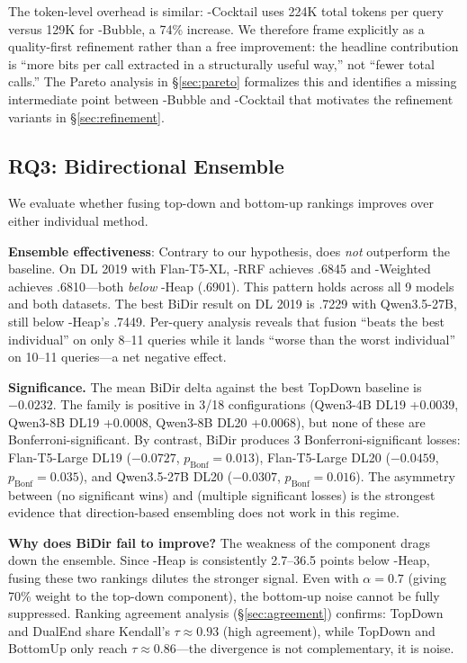 The token-level overhead is similar: \dualend{}-Cocktail uses 224K total tokens per query versus 129K for \topdown{}-Bubble, a 74\% increase. We therefore frame \dualend{} explicitly as a quality-first refinement rather than a free improvement: the headline contribution is ``more bits per call extracted in a structurally useful way,'' not ``fewer total calls.'' The Pareto analysis in \S\ref{sec:pareto} formalizes this and identifies a missing intermediate point between \topdown{}-Bubble and \dualend{}-Cocktail that motivates the refinement variants in \S\ref{sec:refinement}.


\subsection{RQ3: Bidirectional Ensemble}
\label{sec:rq3}

We evaluate whether fusing top-down and bottom-up rankings improves over either individual method.

\textbf{Ensemble effectiveness}: Contrary to our hypothesis, \bidir{} does \emph{not} outperform the \topdown{} baseline. On DL 2019 with Flan-T5-XL, \bidir{}-RRF achieves .6845 and \bidir{}-Weighted achieves .6810---both \emph{below} \topdown{}-Heap (.6901). This pattern holds across all 9 models and both datasets. The best BiDir result on DL 2019 is .7229 with Qwen3.5-27B, still below \topdown{}-Heap's .7449. Per-query analysis reveals that fusion ``beats the best individual'' on only 8--11 queries while it lands ``worse than the worst individual'' on 10--11 queries---a net negative effect.

\textbf{Significance.} The mean BiDir delta against the best TopDown baseline is $-0.0232$. The family is positive in 3/18 configurations (Qwen3-4B DL19 +0.0039, Qwen3-8B DL19 +0.0008, Qwen3-8B DL20 +0.0068), but none of these are Bonferroni-significant. By contrast, BiDir produces 3 Bonferroni-significant losses: Flan-T5-Large DL19 ($-0.0727$, $p_\text{Bonf}=0.013$), Flan-T5-Large DL20 ($-0.0459$, $p_\text{Bonf}=0.035$), and Qwen3.5-27B DL20 ($-0.0307$, $p_\text{Bonf}=0.016$). The asymmetry between (no significant wins) and (multiple significant losses) is the strongest evidence that direction-based ensembling does not work in this regime.

\textbf{Why does BiDir fail to improve?} The weakness of the \bottomup{} component drags down the ensemble. Since \bottomup{}-Heap is consistently 2.7--36.5 points below \topdown{}-Heap, fusing these two rankings dilutes the stronger signal. Even with $\alpha=0.7$ (giving 70\% weight to the top-down component), the bottom-up noise cannot be fully suppressed. Ranking agreement analysis (\S\ref{sec:agreement}) confirms: TopDown and DualEnd share Kendall's $\tau \approx 0.93$ (high agreement), while TopDown and BottomUp only reach $\tau \approx 0.86$---the divergence is not complementary, it is noise.

